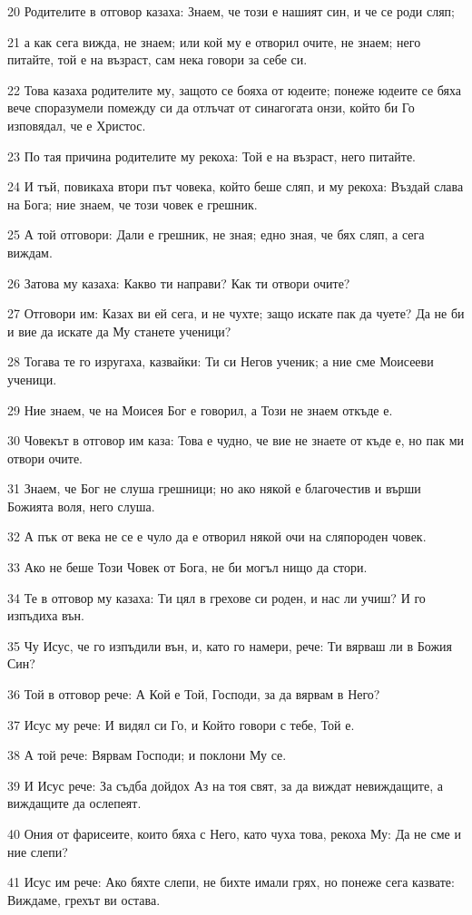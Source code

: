 \par 20 Родителите в отговор казаха: Знаем, че този е нашият син, и че се роди сляп;
\par 21 а как сега вижда, не знаем; или кой му е отворил очите, не знаем; него питайте, той е на възраст, сам нека говори за себе си.
\par 22 Това казаха родителите му, защото се бояха от юдеите; понеже юдеите се бяха вече споразумели помежду си да отлъчат от синагогата онзи, който би Го изповядал, че е Христос.
\par 23 По тая причина родителите му рекоха: Той е на възраст, него питайте.
\par 24 И тъй, повикаха втори път човека, който беше сляп, и му рекоха: Въздай слава на Бога; ние знаем, че този човек е грешник.
\par 25 А той отговори: Дали е грешник, не зная; едно зная, че бях сляп, а сега виждам.
\par 26 Затова му казаха: Какво ти направи? Как ти отвори очите?
\par 27 Отговори им: Казах ви ей сега, и не чухте; защо искате пак да чуете? Да не би и вие да искате да Му станете ученици?
\par 28 Тогава те го изругаха, казвайки: Ти си Негов ученик; а ние сме Моисееви ученици.
\par 29 Ние знаем, че на Моисея Бог е говорил, а Този не знаем откъде е.
\par 30 Човекът в отговор им каза: Това е чудно, че вие не знаете от къде е, но пак ми отвори очите.
\par 31 Знаем, че Бог не слуша грешници; но ако някой е благочестив и върши Божията воля, него слуша.
\par 32 А пък от века не се е чуло да е отворил някой очи на сляпороден човек.
\par 33 Ако не беше Този Човек от Бога, не би могъл нищо да стори.
\par 34 Те в отговор му казаха: Ти цял в грехове си роден, и нас ли учиш? И го изпъдиха вън.
\par 35 Чу Исус, че го изпъдили вън, и, като го намери, рече: Ти вярваш ли в Божия Син?
\par 36 Той в отговор рече: А Кой е Той, Господи, за да вярвам в Него?
\par 37 Исус му рече: И видял си Го, и Който говори с тебе, Той е.
\par 38 А той рече: Вярвам Господи; и поклони Му се.
\par 39 И Исус рече: За съдба дойдох Аз на тоя свят, за да виждат невиждащите, а виждащите да ослепеят.
\par 40 Ония от фарисеите, които бяха с Него, като чуха това, рекоха Му: Да не сме и ние слепи?
\par 41 Исус им рече: Ако бяхте слепи, не бихте имали грях, но понеже сега казвате: Виждаме, грехът ви остава.

